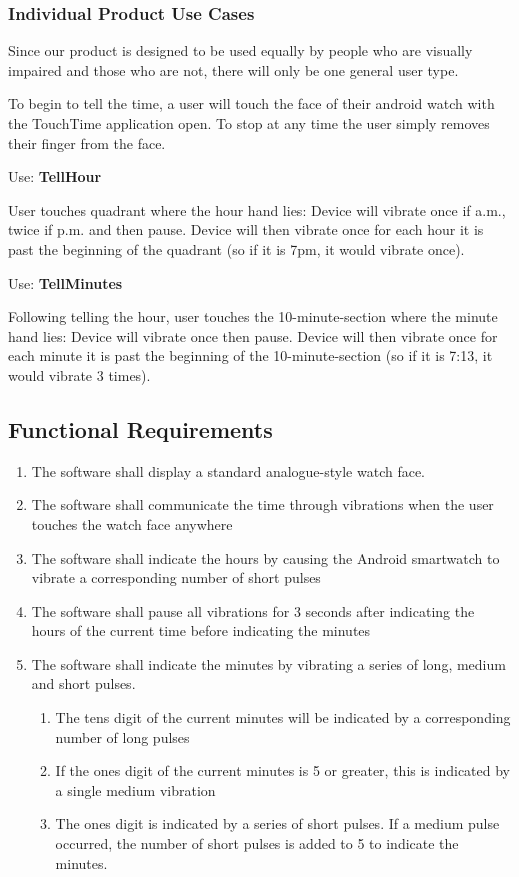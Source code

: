 \documentclass[12pt, titlepage]{article}
\begin{document}
\subsubsection{Individual Product Use Cases}

Since our product is designed to be used equally by people who are visually impaired and those who are not, there will only be one general user type.
\vspace{2mm}

To begin to tell the time, a user will touch the face of their android watch with the TouchTime application open. To stop at any time the user simply removes their finger from the face.
\vspace{2mm}

\noindent Use: \textbf{TellHour}

User touches quadrant where the hour hand lies:
	Device will vibrate once if a.m., twice if p.m. and then pause.
	Device will then vibrate once for each hour it is past the beginning of the quadrant (so if it is 7pm, it would vibrate once).
\vspace{2mm}

\noindent Use: \textbf{TellMinutes}

Following telling the hour, user touches the 10-minute-section where the minute hand lies:
	Device will vibrate once then pause.
	Device will then vibrate once for each minute it is past the beginning of the 10-minute-section (so if it is 7:13, it would vibrate 3 times).

\newpage
\subsection{Functional Requirements}
\begin{enumerate}
\item The software shall display a standard analogue-style watch face.
\item The software shall communicate the time through vibrations when the user touches the watch face anywhere
\item The software shall indicate the hours by causing the Android smartwatch to vibrate a corresponding number of short pulses
\item The software shall pause all vibrations for 3 seconds after indicating the hours of the current time before indicating the minutes
\item The software shall indicate the minutes by vibrating a series of long, medium and short pulses.
\begin{enumerate}
\item The tens digit of the current minutes will be indicated by a corresponding number of long pulses
\item If the ones digit of the current minutes is 5 or greater, this is indicated by a single medium vibration
\item The ones digit is indicated by a series of short pulses. If a medium pulse occurred, the number of short pulses is added to 5 to indicate the minutes.
\end{enumerate}

\end{enumerate}
\end{document}

